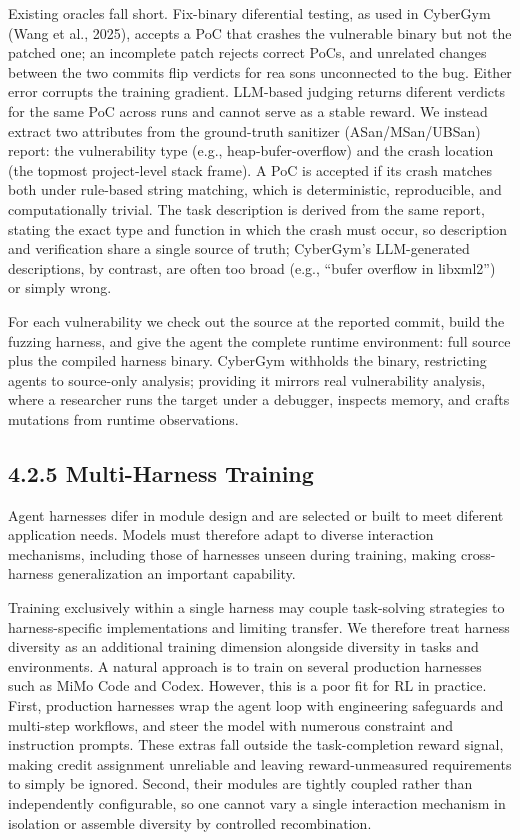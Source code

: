 \documentclass[
  10
]{article}
\begin{document}
Existing oracles fall short. Fix-binary diferential testing, as used in
CyberGym (Wang et al., 2025), accepts a PoC that crashes the vulnerable
binary but not the patched one; an incomplete patch rejects correct
PoCs, and unrelated changes between the two commits flip verdicts for
rea sons unconnected to the bug. Either error corrupts the training
gradient. LLM-based judging returns diferent verdicts for the same PoC
across runs and cannot serve as a stable reward. We instead extract two
attributes from the ground-truth sanitizer (ASan/MSan/UBSan) report: the
vulnerability type (e.g., heap-bufer-overflow) and the crash location
(the topmost project-level stack frame). A PoC is accepted if its crash
matches both under rule-based string matching, which is deterministic,
reproducible, and computationally trivial. The task description is
derived from the same report, stating the exact type and function in
which the crash must occur, so description and verification share a
single source of truth; CyberGym's LLM-generated descriptions, by
contrast, are often too broad (e.g., ``bufer overflow in libxml2'') or
simply wrong.

For each vulnerability we check out the source at the reported commit,
build the fuzzing harness, and give the agent the complete runtime
environment: full source plus the compiled harness binary. CyberGym
withholds the binary, restricting agents to source-only analysis;
providing it mirrors real vulnerability analysis, where a researcher
runs the target under a debugger, inspects memory, and crafts mutations
from runtime observations.

\subsection{4.2.5 Multi-Harness Training}\label{multi-harness-training}

Agent harnesses difer in module design and are selected or built to meet
diferent application needs. Models must therefore adapt to diverse
interaction mechanisms, including those of harnesses unseen during
training, making cross-harness generalization an important capability.

Training exclusively within a single harness may couple task-solving
strategies to harness-specific implementations and limiting transfer. We
therefore treat harness diversity as an additional training dimension
alongside diversity in tasks and environments. A natural approach is to
train on several production harnesses such as MiMo Code and Codex.
However, this is a poor fit for RL in practice. First, production
harnesses wrap the agent loop with engineering safeguards and multi-step
workflows, and steer the model with numerous constraint and instruction
prompts. These extras fall outside the task-completion reward signal,
making credit assignment unreliable and leaving reward-unmeasured
requirements to simply be ignored. Second, their modules are tightly
coupled rather than independently configurable, so one cannot vary a
single interaction mechanism in isolation or assemble diversity by
controlled recombination.
\end{document}
